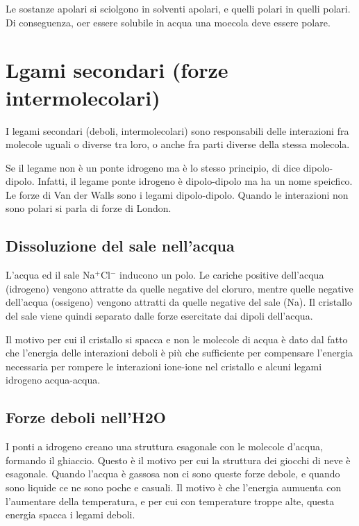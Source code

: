 \documentclass[a4paper]{article}
\begin{document}
Le sostanze apolari si sciolgono in solventi apolari, e quelli polari in quelli polari.
Di conseguenza, oer essere solubile in acqua una moecola deve essere polare.


\section{Lgami secondari (forze intermolecolari)}


I legami secondari (deboli, intermolecolari) sono responsabili delle interazioni fra molecole uguali o diverse tra loro,
o anche fra parti diverse della stessa molecola.

Se il legame non è un ponte idrogeno ma è lo stesso principio, di dice dipolo-dipolo.
Infatti, il legame ponte idrogeno è dipolo-dipolo ma ha un nome speicfico.
Le forze di Van der Walls sono i legami dipolo-dipolo.
Quando le interazioni non sono polari si parla di forze di London.

\subsection{Dissoluzione del sale nell'acqua}

L'acqua ed il sale Na\(^{+}\)Cl\(^{-}\) inducono un polo.
Le cariche positive dell'acqua (idrogeno) vengono attratte da quelle negative
del cloruro, mentre quelle negative dell'acqua (ossigeno)
vengono attratti da quelle negative del sale (Na).
Il cristallo del sale viene quindi separato dalle forze
esercitate dai dipoli dell'acqua.

Il motivo per cui il cristallo si spacca e non le molecole di acqua
è dato dal fatto che l'energia delle interazioni deboli è più che sufficiente
per compensare l'energia necessaria per rompere le interazioni ione-ione
nel cristallo e alcuni legami idrogeno acqua-acqua.

\subsection{Forze deboli nell'H2O}

I ponti a idrogeno creano una struttura esagonale con le molecole d'acqua,
formando il ghiaccio.
Questo è il motivo per cui la struttura dei giocchi di neve è esagonale.
Quando l'acqua è gassosa non ci sono queste forze debole, e quando sono
liquide ce ne sono poche e casuali.
Il motivo è che l'energia aumuenta con l'aumentare della temperatura,
e per cui con temperature troppe alte, questa energia spacca i legami deboli.
\end{document}
